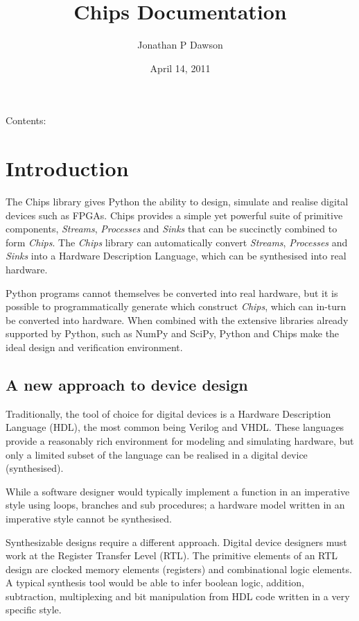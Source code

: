 \documentclass[letterpaper,10pt,english]{manual}
\title{Chips Documentation}
\date{April 14, 2011}
\author{Jonathan P Dawson}
\begin{document}
\maketitle
\tableofcontents
\hypertarget{--doc-index}{}


Contents:

\resetcurrentobjects
\hypertarget{--doc-introduction/index}{}

\chapter{Introduction}

The Chips library gives Python the ability to design, simulate and realise
digital devices such as FPGAs. Chips provides a simple yet powerful suite of
primitive components, \emph{Streams}, \emph{Processes} and \emph{Sinks} that can be
succinctly combined to form \emph{Chips}. The \emph{Chips} library can automatically
convert \emph{Streams}, \emph{Processes} and \emph{Sinks} into a Hardware Description
Language, which can be synthesised into real hardware.

Python programs cannot themselves be converted into real hardware, but it is
possible to programmatically generate which construct \emph{Chips}, which can
in-turn be converted into hardware. When combined with the extensive
libraries already supported by Python, such as NumPy and SciPy, Python and
Chips make the ideal design and verification environment.


\section{A new approach to device design}

Traditionally, the tool of choice for digital devices is a Hardware
Description Language (HDL), the most common being Verilog and VHDL. These
languages provide a reasonably rich environment for modeling and simulating
hardware, but only a limited subset of the language can be realised in a
digital device (synthesised).

While a software designer would typically implement a function in an
imperative style using loops, branches and sub procedures; a hardware model
written in an imperative style cannot be synthesised.

Synthesizable designs require a different approach. Digital device designers
must work at the Register Transfer Level (RTL). The primitive elements of an
RTL design are clocked memory elements (registers) and combinational logic
elements. A typical synthesis tool would be able to infer boolean logic,
addition, subtraction, multiplexing and bit manipulation from HDL code
written in a very specific style.
\end{document}
